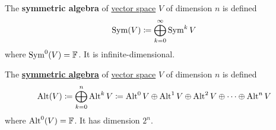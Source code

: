 	\begin{definition}
	  \label{def:symmetric-algebra}
    The \textbf{symmetric algebra} of \hyperref[def:vector-space]{vector space} $V$ of dimension $n$ is defined
		\begin{equation}
    	\operatorname{Sym} (V) \coloneqq \bigoplus_{k=0}^\infty \operatorname{Sym}^k V
		\end{equation}
		where $\operatorname{Sym}^0 (V) = \mathbb{F}$. It is infinite-dimensional. 
  \end{definition}

	\begin{definition}
	  \label{def:exterior-algebra}
    The \textbf{\hyperref[def:symmetric-algebra]{symmetric algebra}} of \hyperref[def:vector-space]{vector space} $V$ of dimension $n$ is defined
		\begin{equation}
			\operatorname{Alt}(V) \coloneqq \bigoplus_{k=0}^n \operatorname{Alt}^k V \coloneqq \operatorname{Alt}^0 V \oplus \operatorname{Alt}^1 V \oplus \operatorname{Alt}^2 V \oplus \cdots \oplus \operatorname{Alt}^n V 
		\end{equation}
		where $\operatorname{Alt}^0 (V) = \mathbb{F}$. It has dimension $2^n$. 
	\end{definition}

